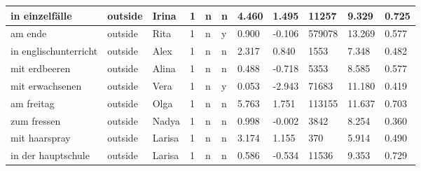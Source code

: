 \begin{longtable}{|p{4cm}|p{1cm}|p{1.2cm}|p{0.5cm}|p{0.5cm}|p{0.5cm}|R{1cm}|R{1cm}|R{1cm}|R{1cm}|R{1cm}|}
in einzelf\"{a}lle         & outside           & Irina         & 1                                   & n                          & n                          & 4.460      & 1.495         & 11257                   & 9.329                         & 0.725                   \\ \hline
am ende                    & outside           & Rita          & 1                                   & n                          & y                          & 0.900      & -0.106        & 579078                  & 13.269                        & 0.577                   \\ \hline
in englischunterricht      & outside           & Alex          & 1                                   & n                          & n                          & 2.317      & 0.840         & 1553                    & 7.348                         & 0.482                   \\ \hline
mit erdbeeren              & outside           & Alina         & 1                                   & n                          & n                          & 0.488      & -0.718        & 5353                    & 8.585                         & 0.577                   \\ \hline
mit erwachsenen            & outside           & Vera          & 1                                   & n                          & y                          & 0.053      & -2.943        & 71683                   & 11.180                        & 0.419                   \\ \hline
am freitag                 & outside           & Olga          & 1                                   & n                          & n                          & 5.763      & 1.751         & 113155                  & 11.637                        & 0.703                   \\ \hline
zum fressen                & outside           & Nadya         & 1                                   & n                          & n                          & 0.998      & -0.002        & 3842                    & 8.254                         & 0.360                   \\ \hline
mit haarspray              & outside           & Larisa        & 1                                   & n                          & n                          & 3.174      & 1.155         & 370                     & 5.914                         & 0.490                   \\ \hline
in der hauptschule         & outside           & Larisa        & 1                                   & n                          & n                          & 0.586      & -0.534        & 11536                   & 9.353                         & 0.729                   \\ \hline

\end{longtable}
